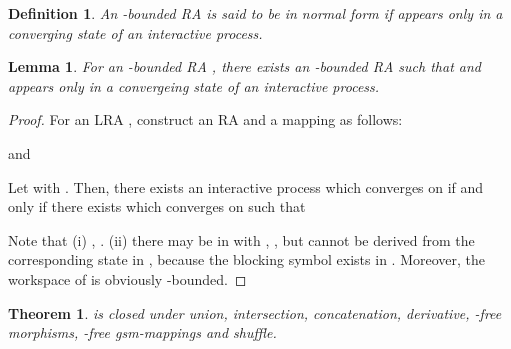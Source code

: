 \documentclass[preprint,fleqn,1p]{elsarticle}
\newtheorem{thm}{Theorem}
\newtheorem{lem}{Lemma}
\newtheorem{de}{Definition}
\begin{document}
\begin{de} \rm{
An -bounded RA  is said to be in} \it{normal form} \rm{if  appears  only in a converging state of an interactive process.}
\end{de}


\begin{lem}
For an -bounded RA , there exists an -bounded RA  such that  and  appears  only in a convergeing state of an interactive process. \label{lem-nf}
\end{lem}

\begin{proof}
For an LRA , construct an RA  and a mapping  as follows:

and

Let  with . Then, there exists an interactive process  which converges on  if and only if there exists  which converges on   such that

Note that (i) , . (ii) there may be  in  with , , but  cannot be derived from the corresponding state  in , because the blocking symbol  exists in . Moreover, the workspace of  is obviously -bounded.
\end{proof}

\begin{thm}
 is closed under union, intersection, concatenation, derivative, -free morphisms, -free gsm-mappings and shuffle.
\end{thm}
\end{document}
